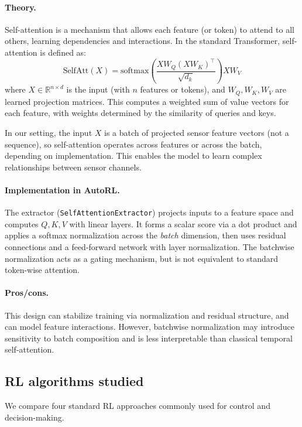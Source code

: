 \documentclass[11pt]{article}
\begin{document}
\paragraph{Theory.}
Self-attention is a mechanism that allows each feature (or token) to attend to all others, learning dependencies and interactions. In the standard Transformer, self-attention is defined as:
\begin{equation}
  \mathrm{SelfAtt}(X) = \mathrm{softmax}\left(\frac{XW_Q (XW_K)^\top}{\sqrt{d_k}}\right) XW_V
\end{equation}
where $X \in \mathbb{R}^{n \times d}$ is the input (with $n$ features or tokens), and $W_Q, W_K, W_V$ are learned projection matrices. This computes a weighted sum of value vectors for each feature, with weights determined by the similarity of queries and keys.

In our setting, the input $X$ is a batch of projected sensor feature vectors (not a sequence), so self-attention operates across features or across the batch, depending on implementation. This enables the model to learn complex relationships between sensor channels.

\paragraph{Implementation in AutoRL.}
The extractor (\texttt{SelfAttentionExtractor}) projects inputs to a feature space and computes $Q,K,V$ with linear layers. It forms a scalar score via a dot product and applies a softmax normalization across the \emph{batch} dimension, then uses residual connections and a feed-forward network with layer normalization. The batchwise normalization acts as a gating mechanism, but is not equivalent to standard token-wise attention.

\paragraph{Pros/cons.}
This design can stabilize training via normalization and residual structure, and can model feature interactions. However, batchwise normalization may introduce sensitivity to batch composition and is less interpretable than classical temporal self-attention.

\subsection{RL algorithms studied}
We compare four standard RL approaches commonly used for control and decision-making.
\end{document}

